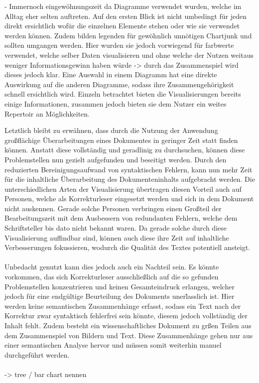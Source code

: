 - Immernoch eingew\"ohnungszeit da Diagramme verwendet wurden, welche im Alltag eher selten auftreten. Auf den ersten Blick ist nicht umbedingt f\"ur jeden direkt ersichtlich wof\"ur die einzelnen Elemente stehen oder wie sie verwendet werden k\"onnen. Zudem bilden legenden f\"ur gew\"ohnlich unn\"otigen Chartjunk und sollten umgangen werden. Hier wurden sie jedoch vorwiegend f\"ur farbwerte verwendet, welche selber Daten visualisieren und ohne welche der Nutzen weitaus weniger Informationsgewinn haben w\"urde -> durch das Zusammenspiel wird dieses jedoch klar. Eine Auswahl in einem Diagramm hat eine direkte Auswirkung auf die anderen Diagramme, sodass ihre Zusammengeh\"origkeit schnell ersichtlich wird. Einzeln betrachtet bieten die Visualisierungen bereits einige Informationen, zusammen jedoch bieten sie dem Nutzer ein weites Repertoir an M\"oglichkeiten.

Letztlich bleibt zu erw\"ahnen, dass durch die Nutzung der Anwendung gro{\ss}fl\"achige \"Uberarbeitungen eines Dokumentes in geringer Zeit statt finden k\"onnen. Anstatt diese vollst\"andig und geradlinig zu durchsuchen, k\"onnen diese Problemstellen nun gezielt aufgefunden und beseitigt werden. Durch den reduzierten Bereinigungsaufwand von syntaktischen Fehlern, kann nun mehr Zeit f\"ur die inhaltliche \"Uberarbeitung des Dokumenteninhalts aufgebracht werden. Die unterschiedlichen Arten der Visualisierung \"ubertragen diesen Vorteil auch auf Personen, welche als Korrekturleser eingesetzt werden und sich in dem Dokument nicht auskennen. Gerade solche Personen verbringen einen Gro{\ss}teil der Bearbeitungszeit mit dem Ausbessern von redundanten Fehlern, welche dem Schriftsteller bis dato nicht bekannt waren. Da gerade solche durch diese Visualisierung auffindbar sind, k\"onnen auch diese ihre Zeit auf inhaltliche Verbesserungen fokussieren, wodurch die Qualit\"at des Textes potentiell ansteigt.\\
\\
Unbedacht genutzt kann dies jedoch auch ein Nachteil sein. Es k\"onnte vorkommen, das sich Korrekturleser ausschlie{\ss}lich auf die so gefunden Problemstellen konzentrieren und keinen Gesamteindruck erlangen, welcher jedoch f\"ur eine endg\"ultige Beurteilung des Dokuments uner\"lasslich ist. Hier werden keine semantischen Zusammenh\"ange erfasst, sodass ein Text nach der Korrektur zwar syntaktisch fehlerfrei sein k\"onnte, diesem jedoch vollst\"andig der Inhalt fehlt. Zudem besteht ein wissenschaftliches Dokument zu gr{\ss}en Teilen aus dem Zusammenspiel von Bildern und Text. Diese Zusammenh\"ange gehen nur aus einer semantischen Analyse hervor und m\"ussen somit weiterhin manuel durchgef\"uhrt werden.\\
\\

-> tree / bar chart nennen